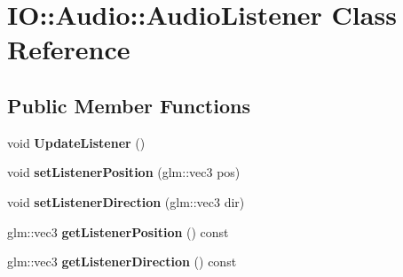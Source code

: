 \hypertarget{class_i_o_1_1_audio_1_1_audio_listener}{}\section{IO\+:\+:Audio\+:\+:Audio\+Listener Class Reference}
\label{class_i_o_1_1_audio_1_1_audio_listener}
\subsection*{Public Member Functions}
\begin{DoxyCompactItemize}
\item 
void {\bfseries Update\+Listener} ()\hypertarget{class_i_o_1_1_audio_1_1_audio_listener_a8ecb93a04ab93ae63d6c23e5a6035364}{}\label{class_i_o_1_1_audio_1_1_audio_listener_a8ecb93a04ab93ae63d6c23e5a6035364}

\item 
void {\bfseries set\+Listener\+Position} (glm\+::vec3 pos)\hypertarget{class_i_o_1_1_audio_1_1_audio_listener_a3eeb956aea0c66124ee265b04d5b6c14}{}\label{class_i_o_1_1_audio_1_1_audio_listener_a3eeb956aea0c66124ee265b04d5b6c14}

\item 
void {\bfseries set\+Listener\+Direction} (glm\+::vec3 dir)\hypertarget{class_i_o_1_1_audio_1_1_audio_listener_afd39011a9bd287b6288c1f08db25282b}{}\label{class_i_o_1_1_audio_1_1_audio_listener_afd39011a9bd287b6288c1f08db25282b}

\item 
glm\+::vec3 {\bfseries get\+Listener\+Position} () const \hypertarget{class_i_o_1_1_audio_1_1_audio_listener_aa06927e5688b7473bb85874e048b036f}{}\label{class_i_o_1_1_audio_1_1_audio_listener_aa06927e5688b7473bb85874e048b036f}

\item 
glm\+::vec3 {\bfseries get\+Listener\+Direction} () const \hypertarget{class_i_o_1_1_audio_1_1_audio_listener_ab6782fcfaa5c14aedf9222dc58e73c83}{}\label{class_i_o_1_1_audio_1_1_audio_listener_ab6782fcfaa5c14aedf9222dc58e73c83}

\end{DoxyCompactItemize}
